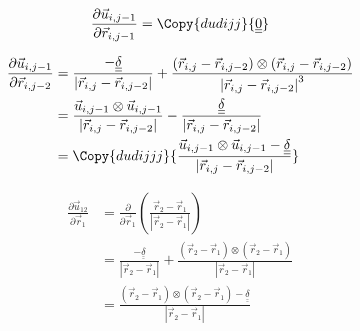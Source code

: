 \documentclass{article}
\renewcommand{\ij}{_{i,j}}
\newcommand{\ijj}{_{i,j-1}}
\newcommand{\ijk}{_{i,j-2}}
\newcommand{\ijjj}{_{i,j-2}}
\newcommand{\magn}[1]{\left\vert #1 \right\vert }
\renewcommand{\part}[2]{\frac{\partial #1 }{\partial #2}}
\newcommand{\partbig}[2]{\frac{\partial }{\partial #2}\left( #1 \right)}
\newcommand{\ten}[1]{\underline{\underline{#1}}}
\newcommand{\rij}{\vec{r} \ij}
\newcommand{\rijjj}{\vec{r} \ijjj}
\newcommand{\rijk}{\vec{r} \ijk}
\newcommand{\uijj}{\vec{u} \ijj}
\begin{document}
\begin{align*}
  \part{\vec{u} \ijj }{\vec{r} \ijj} = 
  \Copy{dudijj}{ \ten{0}}
\end{align*}

\begin{align*}
  \part{\vec{u} \ijj }{\vec{r} \ijk} 
  &=
     \frac{-\ten{\delta }}{\magn{\vec{r} \ij - \vec{r} \ijjj}} 
  +
  \frac{
    \left(\rij - \rijk \right)\otimes 
  \left(\rij - \rijk \right)
  }{
    \magn{\rij - \rijjj } ^3
    }
  \\
  & =
  \frac{\uijj \otimes \uijj}{\magn{\rij - \rijjj}}
  -
  \frac{\ten{\delta}}{\magn{\rij - \rijjj}} 
  \\
  &  =
  \Copy{dudijjj}
  {
  \frac{\uijj \otimes \uijj - \ten{\delta} }{\magn{\rij - \rijjj}}
  }
\end{align*}






\begin{align*}
  \part{\vec{u}_{12}}{\vec{r}_{1}} 
  &=
  \partbig{\frac{\vec{r}_2 - \vec{r}_1}{\magn{\vec{r}_2 - \vec{r}_1}}}
  {\vec{r}_{1}}
  \\
  &=
  \frac{-\ten{\delta}}
  {\magn{\vec{r}_{2} - \vec{r}_{1}}} 
  + 
  \frac{(\vec{r}_{2} - \vec{r}_{1} ) 
  \otimes 
  (\vec{r}_{2} - \vec{r}_{1} )
  }
  {\magn{\vec{r}_{2} - \vec{r}_{1}}} \\
  & = 
  \frac{
  (\vec{r}_{2} - \vec{r}_{1} ) 
  \otimes 
  (\vec{r}_{2} - \vec{r}_{1} )
  -
  \ten{\delta}  
  }
  {\magn{\vec{r}_{2} - \vec{r}_{1}}} 
\end{align*}
\end{document}
